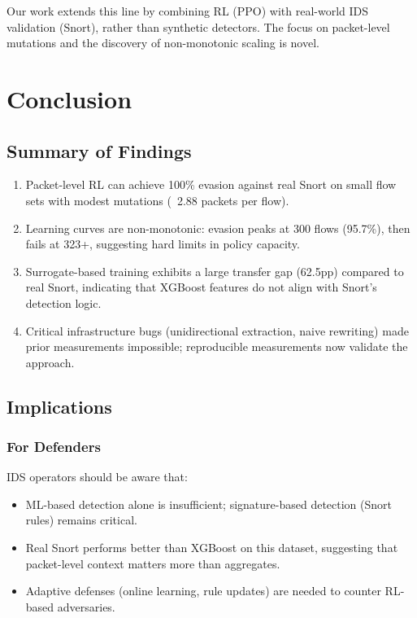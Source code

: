 \documentclass[12pt,a4paper]{report}
\begin{document}
Our work extends this line by combining RL (PPO) with real-world IDS validation (Snort), rather than synthetic detectors. The focus on packet-level mutations and the discovery of non-monotonic scaling is novel.

\chapter{Conclusion}

\section{Summary of Findings}

\begin{enumerate}
  \item Packet-level RL can achieve 100\% evasion against real Snort on small flow sets with modest mutations (~2.88 packets per flow).
  
  \item Learning curves are non-monotonic: evasion peaks at 300 flows (95.7\%), then fails at 323+, suggesting hard limits in policy capacity.
  
  \item Surrogate-based training exhibits a large transfer gap (62.5pp) compared to real Snort, indicating that XGBoost features do not align with Snort's detection logic.
  
  \item Critical infrastructure bugs (unidirectional extraction, naive rewriting) made prior measurements impossible; reproducible measurements now validate the approach.
\end{enumerate}

\section{Implications}

\subsection{For Defenders}
IDS operators should be aware that:
\begin{itemize}
  \item ML-based detection alone is insufficient; signature-based detection (Snort rules) remains critical.
  \item Real Snort performs better than XGBoost on this dataset, suggesting that packet-level context matters more than aggregates.
  \item Adaptive defenses (online learning, rule updates) are needed to counter RL-based adversaries.
\end{itemize}
\end{document}

